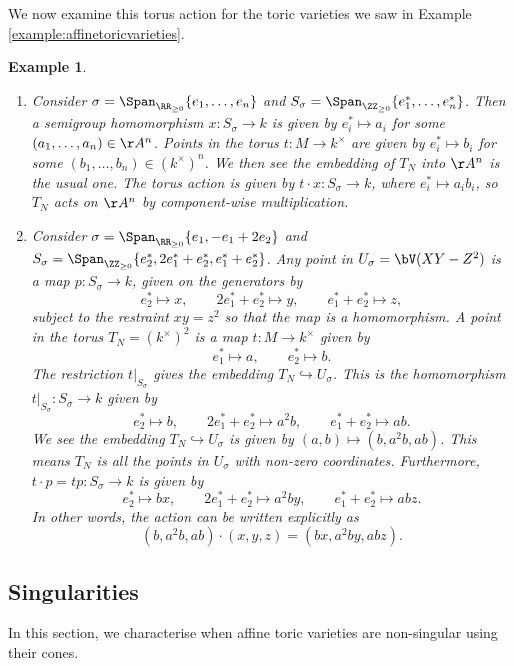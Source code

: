 \documentclass[12pt]{amsart}
\theoremstyle{plain}
\newtheorem{example}[theorem]{Example}
\begin{document}
We now examine this torus action for the toric varieties we saw in Example \ref{example:affinetoricvarieties}.

\begin{example}
\begin{enumerate}
\item Consider $\sigma = \Span_{\RR_{\ge 0}}\{e_1, \ldots, e_n\}$ and $S_\sigma = \Span_{\ZZ_{\ge 0}}\{e_1^*, \ldots, e_n^*\}$.
Then a semigroup homomorphism $x : S_\sigma \to k$ is given by $e_i^* \mapsto a_i$ for some $(a_1, \ldots, a_n) \in \AA^n$.
Points in the torus $t : M \to k^\times$ are given by $e_i^* \mapsto b_i$ for some $(b_1, \ldots, b_n)\in(k^\times)^n$.
We then see the embedding of $T_N$ into $\AA^n$ is the usual one.
The torus action is given by $t\cdot x : S_\sigma \to k$, where $e_i^* \mapsto a_i b_i$, so $T_N$ acts on $\AA^n$ by component-wise multiplication.
\item Consider $\sigma = \Span_{\RR_{\ge 0}} \{e_1, -e_1 + 2 e_2\}$ and $S_\sigma = \Span_{\ZZ_{\ge 0}}\{e_2^*, 2e_1^*+e_2^*, e_1^*+e_2^*\}$.
Any point in $U_\sigma = \bV(XY- Z^2)$ is a map $p : S_\sigma \to k$, given on the generators by
$$e_2^* \mapsto x, \qquad 2e_1^*+e_2^* \mapsto y, \qquad e_1^*+e_2^* \mapsto z,$$
subject to the restraint $xy=z^2$ so that the map is a homomorphism.
A point in the torus $T_N = (k^\times)^2$ is a map $t : M \to k^\times$ given by
$$e_1^* \mapsto a, \qquad e_2^* \mapsto b.$$
The restriction $\left. t \right|_{S_\sigma}$ gives the embedding $T_N \hookrightarrow U_\sigma$.
This is the homomorphism $\left. t \right|_{S_\sigma} : S_\sigma \to k$ given by
$$e_2^* \mapsto b, \qquad 2e_1^*+e_2^* \mapsto a^2 b, \qquad e_1^*+e_2^* \mapsto ab.$$
We see the embedding $T_N \hookrightarrow U_\sigma$ is given by $(a, b) \mapsto (b, a^2 b, ab)$.
This means $T_N$ is all the points in $U_\sigma$ with non-zero coordinates.
Furthermore, $t\cdot p = tp : S_\sigma \to k$ is given by
$$e_2^* \mapsto bx, \qquad 2e_1^*+e_2^* \mapsto a^2 by, \qquad e_1^*+e_2^* \mapsto abz.$$
In other words, the action can be written explicitly as
$$(b, a^2b, ab) \cdot (x, y, z) = (bx, a^2by, abz).$$
\end{enumerate}
\end{example}


\subsection{Singularities}
In this section, we characterise when affine toric varieties are non-singular using their cones.
\end{document}
